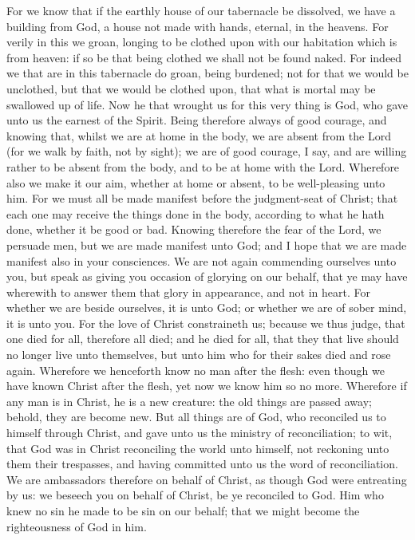 For we know that if the earthly house of our tabernacle be dissolved, we have a building from God, a house not made with hands, eternal, in the heavens. For verily in this we groan, longing to be clothed upon with our habitation which is from heaven: if so be that being clothed we shall not be found naked. For indeed we that are in this tabernacle do groan, being burdened; not for that we would be unclothed, but that we would be clothed upon, that what is mortal may be swallowed up of life. Now he that wrought us for this very thing is God, who gave unto us the earnest of the Spirit. Being therefore always of good courage, and knowing that, whilst we are at home in the body, we are absent from the Lord (for we walk by faith, not by sight); we are of good courage, I say, and are willing rather to be absent from the body, and to be at home with the Lord. Wherefore also we make it our aim, whether at home or absent, to be well-pleasing unto him. For we must all be made manifest before the judgment-seat of Christ; that each one may receive the things done in the body, according to what he hath done, whether it be good or bad.  Knowing therefore the fear of the Lord, we persuade men, but we are made manifest unto God; and I hope that we are made manifest also in your consciences. We are not again commending ourselves unto you, but speak as giving you occasion of glorying on our behalf, that ye may have wherewith to answer them that glory in appearance, and not in heart. For whether we are beside ourselves, it is unto God; or whether we are of sober mind, it is unto you. For the love of Christ constraineth us; because we thus judge, that one died for all, therefore all died; and he died for all, that they that live should no longer live unto themselves, but unto him who for their sakes died and rose again. Wherefore we henceforth know no man after the flesh: even though we have known Christ after the flesh, yet now we know him so no more. Wherefore if any man is in Christ, he is a new creature: the old things are passed away; behold, they are become new. But all things are of God, who reconciled us to himself through Christ, and gave unto us the ministry of reconciliation; to wit, that God was in Christ reconciling the world unto himself, not reckoning unto them their trespasses, and having committed unto us the word of reconciliation.  We are ambassadors therefore on behalf of Christ, as though God were entreating by us: we beseech you on behalf of Christ, be ye reconciled to God. Him who knew no sin he made to be sin on our behalf; that we might become the righteousness of God in him. 

